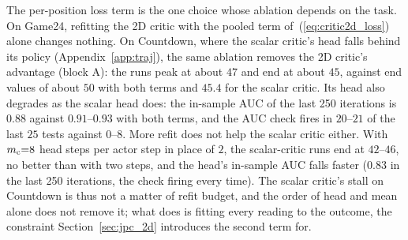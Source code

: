 The per-position loss term is the one choice whose ablation depends on the task. On Game24, refitting the 2D critic with the pooled term of~(\ref{eq:critic2d_loss}) alone changes nothing. On Countdown, where the scalar critic's head falls behind its policy (Appendix~\ref{app:traj}), the same ablation removes the 2D critic's advantage (block A): the runs peak at about $47$ and end at about $45$, against end values of about $50$ with both terms and $45.4$ for the scalar critic. Its head also degrades as the scalar head does: the in-sample AUC of the last 250 iterations is $0.88$ against $0.91$--$0.93$ with both terms, and the AUC check fires in $20$--$21$ of the last $25$ tests against $0$--$8$. More refit does not help the scalar critic either. With $m_{\rm c}{=}8$ head steps per actor step in place of $2$, the scalar-critic runs end at $42$--$46$, no better than with two steps, and the head's in-sample AUC falls faster ($0.83$ in the last 250 iterations, the check firing every time). The scalar critic's stall on Countdown is thus not a matter of refit budget, and the order of head and mean alone does not remove it; what does is fitting every reading to the outcome, the constraint Section~\ref{sec:jpc_2d} introduces the second term for.
